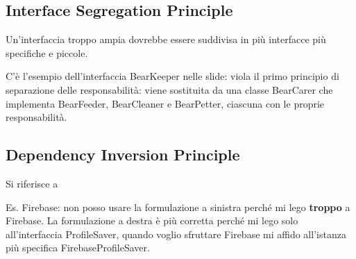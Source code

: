 \subsection{Interface Segregation Principle}
\par Un'interfaccia troppo ampia dovrebbe essere suddivisa in più interfacce più specifiche e piccole.
\par C'è l'esempio dell'interfaccia BearKeeper nelle slide: viola il primo principio di separazione delle responsabilità: viene sostituita da una classe BearCarer che implementa BearFeeder, BearCleaner e BearPetter, ciascuna con le proprie responsabilità.


\subsection{Dependency Inversion Principle}
\par Si riferisce a 
\par Es. Firebase: non posso usare la formulazione a sinistra perché mi lego \textbf{troppo} a Firebase. La formulazione a destra è più corretta perché mi lego solo all'interfaccia ProfileSaver, quando voglio sfruttare Firebase mi affido all'istanza più specifica FirebaseProfileSaver.

